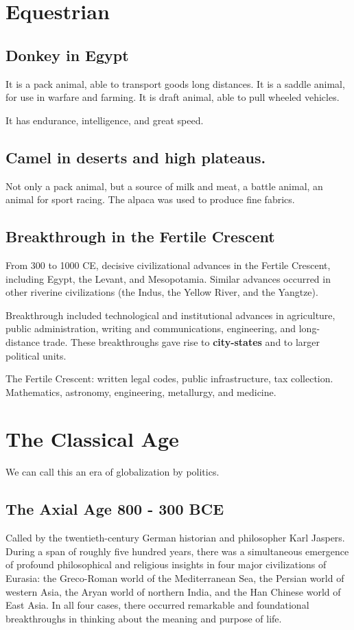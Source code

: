 \documentclass[12pt]{article}
\begin{document}
\section{Equestrian}



\subsection{Donkey in Egypt}
It is a pack animal, able to transport goods long distances.
It is a saddle animal, for use in warfare and farming.
It is draft animal, able to pull wheeled vehicles.

It has endurance, intelligence, and great speed.

\subsection{Camel in deserts and high plateaus.}


Not only a pack animal, but a source of milk and meat, a battle animal,
an animal for sport racing. The alpaca was used to produce fine fabrics.



\subsection{Breakthrough in the Fertile Crescent}
From 300 to 1000 CE, decisive civilizational advances in the Fertile
Crescent, including Egypt, the Levant, and Mesopotamia. Similar advances 
occurred in other riverine civilizations (the Indus, the Yellow River,
and the Yangtze).

Breakthrough included technological and institutional advances in 
agriculture, public administration, writing and communications, 
engineering, and long-distance trade.
These breakthroughs gave rise to {\textbf {city-states}} and to 
larger political units.


The Fertile Crescent: written legal codes, public infrastructure, 
tax collection. Mathematics, astronomy, engineering, metallurgy, 
and medicine.






\section{The Classical Age}
We can call this an era of globalization by politics.

\subsection{The Axial Age 800 - 300 BCE}
Called by the twentieth-century German historian and philosopher
Karl Jaspers. During a span of roughly five hundred years, there was 
a simultaneous emergence of profound philosophical and religious 
insights in four major civilizations of Eurasia: the Greco-Roman world
of the Mediterranean Sea, the Persian world of western Asia, the Aryan
world of northern India, and the Han Chinese world of East Asia. In all
four cases, there occurred remarkable and foundational breakthroughs 
in thinking about the meaning and purpose of life.
\end{document}
